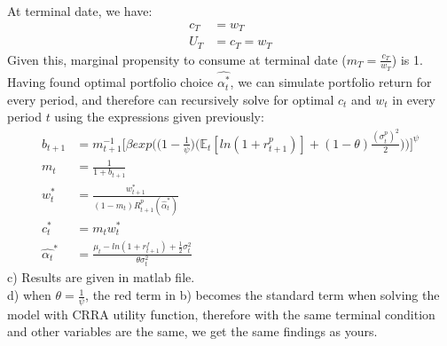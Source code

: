 \documentclass[12pt,a4paper]{article}
\begin{document}
At terminal date, we have: 
\begin{align*}
    c_T&=w_T\\
    U_T&=c_T=w_T
\end{align*}
Given this, marginal propensity to consume at terminal date  \big($m_T=\frac{c_T}{w_T}$\big)  is 1. Having found optimal portfolio choice $ \hat{\alpha_t^*}$, we can simulate portfolio return for every period, and therefore can recursively solve for optimal $c_t$ and $w_t$ in every period $t$ using the expressions given previously: 
\begin{align*}
    b_{t+1}&=m_{t+1}^{-1}\bigg[\beta  exp\bigg(\bigg(1-\frac{1}{\psi}\bigg)\bigg(\mathbb{E}_t[ln(1+r^p_{t+1})]+(1-\theta)\frac{(\sigma_t^p)^2}{2}\bigg)\bigg)\bigg]^{\psi}\\
    m_{t}&=\frac{1}{1+b_{t+1}}\\
    w_t^*&=\frac{w_{t+1}^*}{(1-m_t)R_{t+1}^p(\hat{\alpha}_t^*)}\\
    c_t^*&=m_tw_t^*\\
    \hat{\alpha_t}^{*}&=\frac{\mu_t-ln(1+r^f_{t+1})+\frac{1}{2}\sigma_t^2}{\theta\sigma_t^2} 
\end{align*}
c) Results are given in matlab file.\\

d) when $\theta=\frac{1}{\psi}$, the red term in b) becomes the standard term when solving the model with CRRA utility function, therefore with the same terminal condition and other variables are the same, we get the same findings as yours.\\
\end{document}
